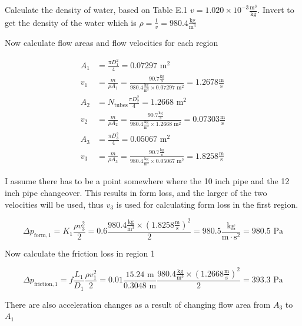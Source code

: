 \documentclass{article}
\begin{document}
Calculate the density of water, based on Table E.1 $v = 1.020 \times 10^{-3} \frac{\text{m}^3}{\text{kg}}$. Invert to get the density of the water which is $\rho = \frac{1}{v} = 980.4 \frac{\text{kg}}{\text{m}^3}$

Now calculate flow areas and flow velocities for each region

\begin{align}
    A_1 &= \frac{\pi D_1^2}{4} = 0.07297 \text{ m}^2 \\
    v_1 &= \frac{m}{\rho A_1} = \frac{90.7 \frac{\text{kg}}{\text{s}}}{980.4 \frac{\text{kg}}{\text{m}^3} \times 0.07297 \text{ m}^2} = 1.2678 \frac{\text{m}}{\text{s}} \\
    A_2 &= N_{\text{tubes}} \frac{\pi D_2^2}{4} = 1.2668 \text{ m}^2 \\
    v_2 &= \frac{m}{\rho A_2} = \frac{90.7 \frac{\text{kg}}{\text{s}}}{980.4 \frac{\text{kg}}{\text{m}^3} \times 1.2668 \text{ m}^2} = 0.07303 \frac{\text{m}}{\text{s}} \\
    A_3 &= \frac{\pi D_3^2}{4} = 0.05067 \text{ m}^2 \\
    v_3 &= \frac{m}{\rho A_3} = \frac{90.7 \frac{\text{kg}}{\text{s}}}{980.4 \frac{\text{kg}}{\text{m}^3} \times 0.05067 \text{ m}^2} = 1.8258 \frac{\text{m}}{\text{s}}
\end{align}

I assume there has to be a point somewhere where the 10 inch pipe and the 12 inch pipe changeover. This results in form loss, and the larger of the two velocities will be used, thus $v_3$ is used for calculating form loss in the first region.

\begin{equation}
    \Delta p_{\text{form},1} = K_1 \frac{\rho v_{3}^2}{2} = 0.6 \frac{980.4 \frac{\text{kg}}{\text{m}^3} \times (1.8258 \frac{\text{m}}{\text{s}})^2}{2} = 980.5 \frac{\text{kg}}{\text{m} \cdot \text{s}^2} = 980.5 \text{ Pa}
\end{equation}

Now calculate the friction loss in region 1

\begin{equation}
    \Delta p_{\text{friction},1} = f \frac{L_1}{D_1} \frac{\rho v_1^2}{2} = 0.01 \frac{15.24 \text{ m}}{0.3048 \text{ m}} \frac{980.4 \frac{\text{kg}}{\text{m}^3} \times (1.2668 \frac{\text{m}}{\text{s}} )^2}{2} = 393.3 \text{ Pa}
\end{equation}

There are also acceleration changes as a result of changing flow area from $A_3$ to $A_1$
\end{document}
